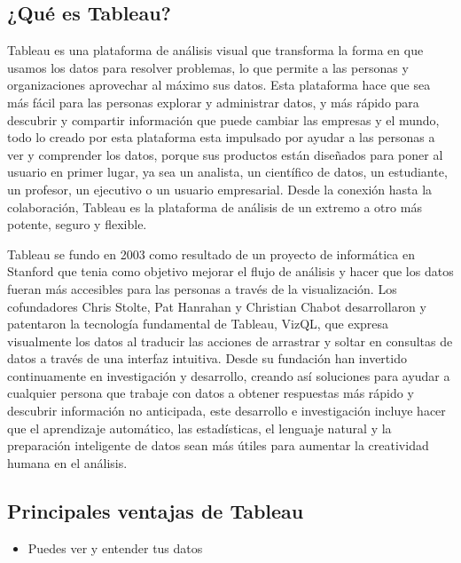 \documentclass[
]{book}
\providecommand{\tightlist}{%
  \setlength{\itemsep}{0pt}\setlength{\parskip}{0pt}}
\begin{document}
\hypertarget{quuxe9-es-tableau}{%
\subsection{¿Qué es Tableau?}\label{quuxe9-es-tableau}}

Tableau es una plataforma de análisis visual que transforma la forma en que usamos los datos para resolver problemas, lo que permite a las personas y organizaciones aprovechar al máximo sus datos. Esta plataforma hace que sea más fácil para las personas explorar y administrar datos, y más rápido para descubrir y compartir información que puede cambiar las empresas y el mundo, todo lo creado por esta plataforma esta impulsado por ayudar a las personas a ver y comprender los datos, porque sus productos están diseñados para poner al usuario en primer lugar, ya sea un analista, un científico de datos, un estudiante, un profesor, un ejecutivo o un usuario empresarial. Desde la conexión hasta la colaboración, Tableau es la plataforma de análisis de un extremo a otro más potente, seguro y flexible.

Tableau se fundo en 2003 como resultado de un proyecto de informática en Stanford que tenia como objetivo mejorar el flujo de análisis y hacer que los datos fueran más accesibles para las personas a través de la visualización. Los cofundadores Chris Stolte, Pat Hanrahan y Christian Chabot desarrollaron y patentaron la tecnología fundamental de Tableau, VizQL, que expresa visualmente los datos al traducir las acciones de arrastrar y soltar en consultas de datos a través de una interfaz intuitiva. Desde su fundación han invertido continuamente en investigación y desarrollo, creando así soluciones para ayudar a cualquier persona que trabaje con datos a obtener respuestas más rápido y descubrir información no anticipada, este desarrollo e investigación incluye hacer que el aprendizaje automático, las estadísticas, el lenguaje natural y la preparación inteligente de datos sean más útiles para aumentar la creatividad humana en el análisis.

\hypertarget{principales-ventajas-de-tableau}{%
\subsection{Principales ventajas de Tableau}\label{principales-ventajas-de-tableau}}

\begin{itemize}
\tightlist
\item
  Puedes ver y entender tus datos
\end{itemize}
\end{document}
